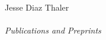 



\thispagestyle{plain}

\begin{center}
{\Large Jesse Diaz Thaler}\\
~\\
{ \large \it Publications and Preprints}\\
{ \small \it }
\end{center}


\fancyfoot[c]{\thepage}





\vspace{-.1in}
 


  